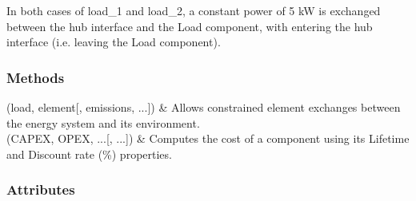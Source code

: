 \documentclass[letterpaper,10pt,english]{sphinxmanual}
\begin{document}
\begin{fulllineitems}
\begin{fulllineitems}
\sphinxAtStartPar
In both cases of load\_1 and load\_2, a constant power of 5 kW is exchanged between the hub interface and the Load component,
with  entering the hub interface (i.e. leaving the Load component).

\end{fulllineitems}

\subsubsection*{Methods}


\begin{savenotes}\sphinxattablestart
\centering
\begin{tabulary}{\linewidth}[t]{}
\hline

\sphinxAtStartPar
{\hyperref[\detokenize{generated/tamos.elementIO.Load:tamos.elementIO.Load.__init__}]{}}(load, element{[}, emissions, ...{]})
&
\sphinxAtStartPar
Allows constrained element exchanges between the energy system and its environment.
\\
\hline
\sphinxAtStartPar
{\hyperref[\detokenize{generated/tamos.elementIO.Load:tamos.elementIO.Load.compute_actualized_cost}]{}}(CAPEX, OPEX, ...{[}, ...{]})
&
\sphinxAtStartPar
Computes the cost of a component using its \textquotesingle{}Lifetime\textquotesingle{} and \textquotesingle{}Discount rate (\%)\textquotesingle{} properties.
\\
\hline
\end{tabulary}
\par
\sphinxattableend\end{savenotes}
\subsubsection*{Attributes}


\begin{savenotes}\sphinxattablestart
\centering
\begin{tabulary}{\linewidth}[t]{}
\hline


\end{tabulary}
\end{savenotes}
\end{fulllineitems}
\end{document}
